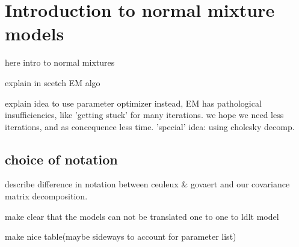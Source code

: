 \chapter{Introduction to normal mixture models}%

here intro to normal mixtures

explain in scetch EM algo

explain idea to use parameter optimizer instead,
EM has pathological insufficiencies, like 'getting stuck' for many iterations.
we hope we need less iterations, and as concequence less time.
'special' idea: using cholesky decomp.


\section{choice of notation}

describe difference in notation between ceuleux \& govaert and our covariance matrix decomposition.

make clear that the models can not be translated one to one to ldlt model

make nice table(maybe sideways to account for parameter list)


